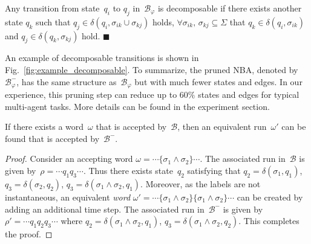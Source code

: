 \begin{definition}\label{def:decomposable-transition}
Any transition from state~$q_i$ to $q_j$ in~$\mathcal{B}_{\varphi}$ is decomposable if there exists another state $q_k$ such that $q_j\in \delta(q_i,\sigma_{ik}\cup\sigma_{kj})$ holds,
$\forall \sigma_{ik},\,\sigma_{kj} \subseteq \Sigma$ that $q_k\in \delta(q_i,\sigma_{ik})$ and $q_j\in \delta(q_k,\sigma_{kj})$ hold.
\hfill $\blacksquare$
\end{definition}

An example of decomposable transitions is shown in Fig.~\ref{fig:example_decomposable}.
To summarize, the pruned NBA, denoted by~$\mathcal{B}^{-}_{\varphi}$,
has the same structure as~$\mathcal{B}_{\varphi}$ but with much fewer states and edges.
In our experience, this pruning step can reduce up to $60\%$ states and edges for typical multi-agent tasks.
More details can be found in the experiment section. 
\begin{lemma}
  If there exists a word~$\omega$ that is accepted by~$\mathcal{B}$,
  then an equivalent run~$\omega'$ can be found that is accepted by~$\mathcal{B}^-$.
\end{lemma}
\begin{proof}
  Consider an accepting word $\omega=\cdots\{\sigma_1\land\sigma_2\}\cdots$.
  The associated run in~$\mathcal{B}$ is given by~$\rho=\cdots q_1 q_3\cdots$.
  Thus there exists state~$q_2$ satisfying that 
  $q_2=\delta(\sigma_1,q_1)$, $q_3=\delta(\sigma_2,q_2)$, $q_3=\delta(\sigma_1\land\sigma_2,q_1)$.
  Moreover, as the labels are not instantaneous, 
  an equivalent \emph{word} $\omega'=\cdots\{\sigma_1\land\sigma_2\}\{\sigma_1\land\sigma_2\}\cdots$
  can be created by adding an additional time step.
  The associated run in~$\mathcal{B}^-$ is given by~$\rho'=\cdots q_1 q_2 q_3\cdots$ where
  $q_2=\delta(\sigma_1\land\sigma_2,q_1)$, $q_3=\delta(\sigma_1\land\sigma_2,q_2)$.
  This completes the proof.
\end{proof}






